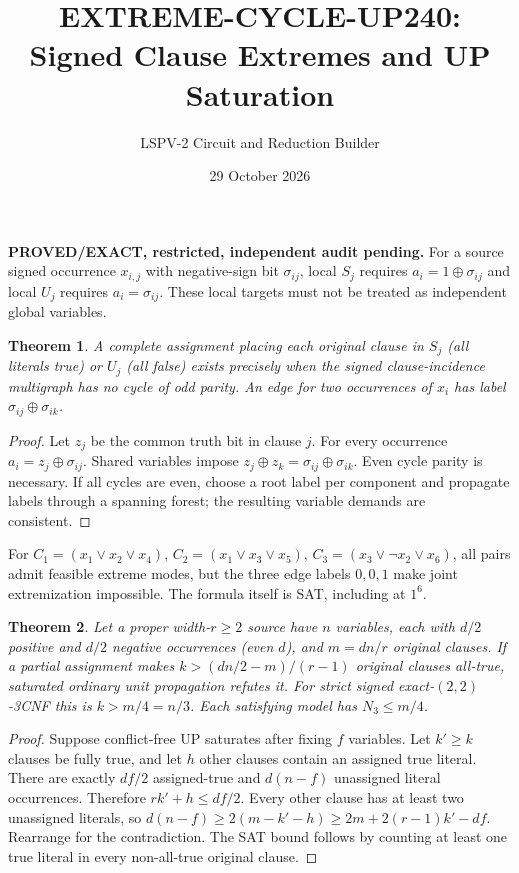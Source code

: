 \documentclass{article}
\newtheorem{theorem}{Theorem}
\begin{document}
\title{EXTREME-CYCLE-UP240: Signed Clause Extremes and UP Saturation}
\author{LSPV-2 Circuit and Reduction Builder}
\date{29 October 2026}
\maketitle
\noindent\textbf{PROVED/EXACT, restricted, independent audit pending.}
For a source signed occurrence $x_{i,j}$ with negative-sign bit
$\sigma_{ij}$, local $S_j$ requires $a_i=1\oplus\sigma_{ij}$ and
local $U_j$ requires $a_i=\sigma_{ij}$.
These local targets must not be treated as independent global variables.
\begin{theorem}
A complete assignment placing each original clause in $S_j$ (all
literals true) or $U_j$ (all false) exists precisely when the
signed clause-incidence multigraph has no cycle of odd parity.
An edge for two occurrences of $x_i$ has label
$\sigma_{ij}\oplus\sigma_{ik}$.
\end{theorem}
\begin{proof}
Let $z_j$ be the common truth bit in clause $j$. For every
occurrence $a_i=z_j\oplus\sigma_{ij}$. Shared variables impose
$z_j\oplus z_k=\sigma_{ij}\oplus\sigma_{ik}$.
Even cycle parity is necessary. If all cycles are even,
choose a root label per component and propagate labels through
a spanning forest; the resulting variable demands are consistent.
\end{proof}
For $C_1=(x_1\lor x_2\lor x_4)$,
$C_2=(x_1\lor x_3\lor x_5)$,
$C_3=(x_3\lor\neg x_2\lor x_6)$,
all pairs admit feasible extreme modes, but the three edge labels
$0,0,1$ make joint extremization impossible.
The formula itself is SAT, including at $1^6$.
\begin{theorem}
Let a proper width-$r\ge2$ source have $n$ variables, each with
$d/2$ positive and $d/2$ negative occurrences (even $d$),
and $m=dn/r$ original clauses.
If a partial assignment makes $k>(dn/2-m)/(r-1)$
original clauses all-true, saturated ordinary unit propagation
refutes it. For strict signed exact-$(2,2)$-3CNF this is
$k>m/4=n/3$. Each satisfying model has $N_3\le m/4$.
\end{theorem}
\begin{proof}
Suppose conflict-free UP saturates after fixing $f$ variables.
Let $k'\ge k$ clauses be fully true, and let $h$ other clauses
contain an assigned true literal. There are exactly $df/2$
assigned-true and $d(n-f)$ unassigned literal occurrences.
Therefore $rk'+h\le df/2$.
Every other clause has at least two unassigned literals, so
$d(n-f)\ge2(m-k'-h)\ge2m+2(r-1)k'-df$.
Rearrange for the contradiction.
The SAT bound follows by counting at least one true literal
in every non-all-true original clause.
\end{proof}
\end{document}
